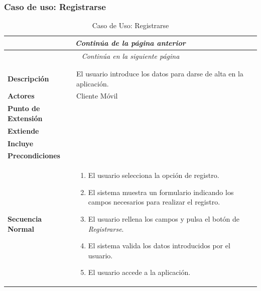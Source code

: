 \subsubsection*{Caso de uso: Registrarse}
\begin{longtable}{| p{4cm} | p{10cm} |}
\endfirsthead
\multicolumn{2}{c}{\textit{Continúa de la página anterior}}\\[12pt]
\hline
\endhead
\hline
\multicolumn{2}{c}{\textit{Continúa en la siguiente página}} \\
\endfoot
\hline
\caption{Caso de Uso: Registrarse}\label{fig:1}\\
\endlastfoot


\hline
\multicolumn{2}{|c|}{\textbf{CU$<$02$>$ - Registrarse}} \\

\hline
\textbf{Descripción} &
El usuario introduce los datos para darse de alta en la aplicación. \\

\hline
\textbf{Actores} &
Cliente Móvil\\

\hline
\textbf{Punto de Extensión} &
\\

\hline
\textbf{Extiende} &
\\

\hline
\textbf{Incluye} &
\\

\hline
\textbf{Precondiciones} &
\\

\hline
\textbf{Secuencia Normal} &\mbox{}\par\vspace{-\baselineskip}
\begin{enumerate}[leftmargin=0.7cm, topsep=0.1cm]
\item El usuario selecciona la opción de registro.
\item El sistema muestra un formulario indicando los campos necesarios para realizar el registro.
\item El usuario rellena los campos y pulsa el botón de \textit{Registrarse}.
\item El sistema valida los datos introducidos por el usuario.
\item El usuario accede a la aplicación.
\end{enumerate}\\


\end{longtable}
